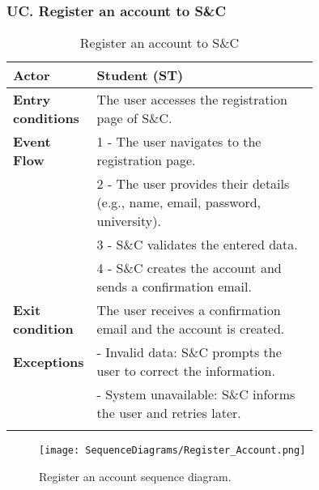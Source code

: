\subsubsection*{UC\cuc . Register an account to S\&C}
\begin{center}
    \begin{longtable}{|l|p{0.75\linewidth}|}
        \hline
        \textbf{Actor}            & Student (ST) \\
        \hline
        \textbf{Entry conditions} & The user accesses the registration page of S\&C. \\
        \hline
        \textbf{Event Flow}       & 1 - The user navigates to the registration page. \\
        & 2 - The user provides their details (e.g., name, email, password, university). \\
        & 3 - S\&C validates the entered data. \\
        & 4 - S\&C creates the account and sends a confirmation email. \\
        \hline
        \textbf{Exit condition}   & The user receives a confirmation email and the account is created. \\       
        \hline
        \textbf{Exceptions}       & - Invalid data: S\&C prompts the user to correct the information. \\
                                  & - System unavailable: S\&C informs the user and retries later. \\
        \hline
        \caption{Register an account to S\&C}
        \label{tab:register_account_usecase}
    \end{longtable}
\end{center}

\begin{figure}[H]
    \begin{center}
        \texttt{[image: SequenceDiagrams/Register\_Account.png]}
        \caption{Register an account sequence diagram.}
        \label{fig:register_account_seqd}%
    \end{center}
\end{figure}


